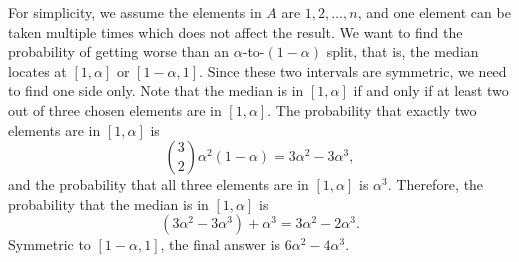 \documentclass[12pt,reqno]{amsart}
\begin{document}
\begin{enumerate}[1.]
For simplicity, we assume the elements in $A$ are $1, 2, \dots, n$, and one element can be taken multiple times which does not affect the result. We want to find the probability of getting worse than an $\alpha$-to-$(1 - \alpha)$ split, that is, the median locates at $[1, \alpha]$ or $[1 - \alpha, 1]$. Since these two intervals are symmetric, we need to find one side only. Note that the median is in $[1, \alpha]$ if and only if at least two out of three chosen elements are in $[1, \alpha]$. The probability that exactly two elements are in $[1, \alpha]$ is
$$
\binom{3}{2}\alpha^2(1 - \alpha) = 3\alpha^2 - 3\alpha^3,
$$
and the probability that all three elements are in $[1, \alpha]$ is $\alpha^3$. Therefore, the probability that the median is in $[1, \alpha]$ is
$$
(3\alpha^2 - 3\alpha^3) + \alpha^3 = 3\alpha^2 - 2\alpha^3.
$$
Symmetric to $[1 - \alpha, 1]$, the final answer is $6\alpha^2 - 4\alpha^3$.




\end{enumerate}
\end{document}

